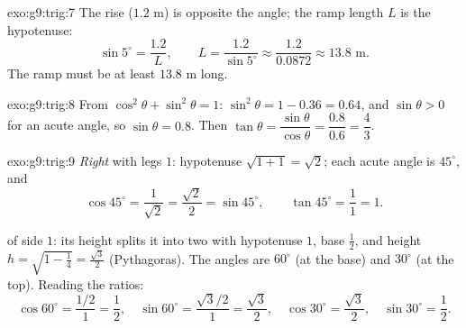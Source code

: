 \begin{solution}{exo:g9:trig:7}
The rise ($1.2$ m) is opposite the angle; the ramp length $L$ is the
hypotenuse:
\[
\sin 5^\circ = \frac{1.2}{L},
\qquad
L = \frac{1.2}{\sin 5^\circ} \approx \frac{1.2}{0.0872} \approx 13.8
\text{ m}.
\]
The ramp must be at least $13.8$ m long.
\end{solution}

\begin{solution}{exo:g9:trig:8}
From $\cos^2\theta + \sin^2\theta = 1$:
$\sin^2\theta = 1 - 0.36 = 0.64$, and $\sin\theta > 0$ for an acute
angle, so $\sin\theta = 0.8$. Then
$\tan\theta = \dfrac{\sin\theta}{\cos\theta} = \dfrac{0.8}{0.6} =
\dfrac43$.
\end{solution}

\begin{solution}{exo:g9:trig:9}
\emph{Right } with legs $1$: hypotenuse
$\sqrt{1 + 1} = \sqrt2$; each acute angle is $45^\circ$, and
\[
\cos 45^\circ = \frac{1}{\sqrt2} = \frac{\sqrt2}{2} = \sin 45^\circ,
\qquad
\tan 45^\circ = \frac11 = 1 .
\]

\emph{} of side $1$: its height splits it into two
 with hypotenuse $1$, base $\frac12$, and height
$h = \sqrt{1 - \frac14} = \frac{\sqrt3}{2}$ (Pythagoras). The angles are
$60^\circ$ (at the base) and $30^\circ$ (at the top). Reading the
ratios:
\[
\cos 60^\circ = \frac{1/2}{1} = \frac12, \quad
\sin 60^\circ = \frac{\sqrt3/2}{1} = \frac{\sqrt3}{2}, \quad
\cos 30^\circ = \frac{\sqrt3}{2}, \quad
\sin 30^\circ = \frac12 .
\]
\end{solution}

